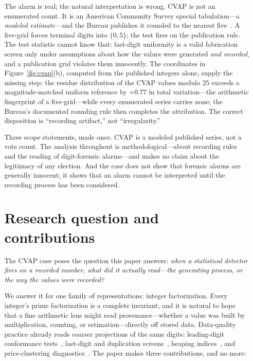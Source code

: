 \documentclass[12pt]{article}
\begin{document}
The alarm is real; the natural interpretation is wrong. CVAP is not an
enumerated count. It is an American Community Survey special tabulation---a
\emph{modeled estimate}---and the Bureau publishes it rounded to the nearest
five~\citep{censuscvap2022,cvaptechdoc}. A five-grid forces terminal digits into
$\{0,5\}$; the test fires on the publication rule. The test statistic cannot
know that: last-digit uniformity is a valid fabrication screen only under
assumptions about how the values were generated \emph{and recorded}, and a
publication grid violates them innocently. The coordinates in
Figure~\ref{fig:cvap}(b), computed from the published integers alone, supply
the missing step: the residue distribution of the CVAP values modulo $25$
exceeds a magnitude-matched uniform reference by $+0.77$ in total
variation---the arithmetic fingerprint of a five-grid---while every
enumerated series carries none; the Bureau's documented rounding rule then
completes the attribution. The correct disposition is ``recording
artifact,'' not ``irregularity.''

Three scope statements, made once. CVAP is a modeled published series, not a
vote count. The analysis throughout is methodological---about recording rules
and the reading of digit-forensic alarms---and makes no claim about the
legitimacy of any election. And the case does not show that forensic alarms
are generally innocent; it shows that an alarm cannot be interpreted until the
recording process has been considered.

\section{Research question and contributions}
\label{sec:question}

The CVAP case poses the question this paper answers: \emph{when a statistical
detector fires on a recorded number, what did it actually read---the
generating process, or the way the values were recorded?}

We answer it for one family of representations: integer factorization. Every
integer's prime factorization is a complete invariant, and it is natural to
hope that a fine arithmetic lens might read provenance---whether a value was
built by multiplication, counting, or estimation---directly off stored data.
Data-quality practice already reads coarser projections of the same digits:
leading-digit conformance tests~\citep{benford1938,hill1995,nigrini2012},
last-digit and duplication screens~\citep{beberscacco2012}, heaping
indices~\citep{myers1940,whipple1919,ahearn2009}, and price-clustering
diagnostics~\citep{harris1991}. The paper makes three contributions, and no
more:
\end{document}
